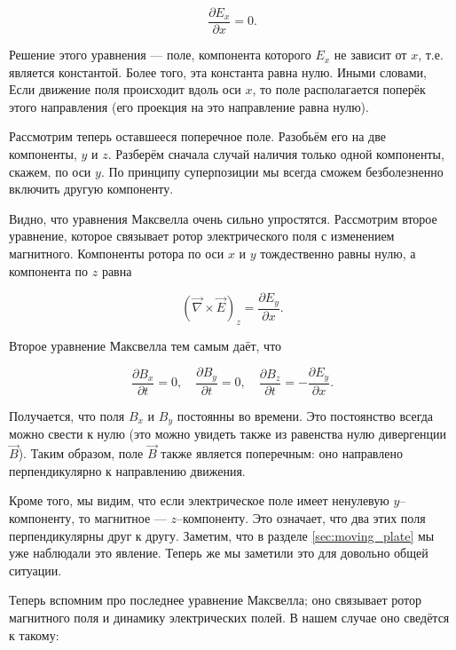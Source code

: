 \documentclass[12pt,a4paper]{article}
\numberwithin{equation}{section}
\numberwithin{equation}{section}
\newcommand{\pt}{\partial}
\newcommand{\vn}{\vec{\nabla}}
\begin{document}
\begin{equation}
  \label{eq:waves_1}
  \frac{\pt E_x}{\pt x}=0.
\end{equation}

Решение этого уравнения --- поле, компонента которого $E_x$ не зависит
от $x$, т.е. является константой. Более того, эта константа равна
нулю. Иными словами, Если движение поля происходит вдоль оси $x$, то
поле располагается поперёк этого направления (его проекция на это
направление равна нулю). 

Рассмотрим теперь оставшееся поперечное поле. Разобьём его на две
компоненты, $y$ и $z$. Разберём сначала случай наличия только одной
компоненты, скажем, по оси $y$. По принципу суперпозиции мы всегда
сможем безболезненно включить другую компоненту. 

Видно, что уравнения Максвелла очень сильно упростятся. Рассмотрим
второе уравнение, которое связывает ротор электрического поля с
изменением магнитного. Компоненты ротора по оси $x$ и $y$ тождественно
равны нулю, а компонента по $z$ равна

\begin{equation}
  \label{eq:waves_2}
  \left(\vn \times \vec{E}  \right)_z = \frac{\pt E_y}{\pt x}.
\end{equation}

Второе уравнение Максвелла тем самым даёт, что

\begin{equation}
  \label{eq:waves_3}
  \frac{\pt B_x}{\pt t} = 0, \quad   \frac{\pt B_y}{\pt t} = 0, \quad
  \frac{\pt B_z}{\pt t} = - \frac{\pt E_y}{\pt x}.
\end{equation}

Получается, что поля $B_x$ и $B_y$ постоянны во времени. Это
постоянство всегда можно свести к нулю (это можно увидеть также из
равенства нулю дивергенции $\vec{B}$). Таким образом, поле $\vec{B}$
также является поперечным: оно направлено перпендикулярно к
направлению движения. 

Кроме того, мы видим, что если электрическое поле имеет ненулевую
$y$--компоненту, то магнитное --- $z$--компоненту. Это означает, что
два этих поля перпендикулярны друг к другу. Заметим, что в разделе
\ref{sec:moving_plate} мы уже наблюдали это явление. Теперь же мы
заметили это для довольно общей ситуации. 

Теперь вспомним про последнее уравнение Максвелла; оно связывает ротор
магнитного поля и динамику электрических полей. В нашем случае оно
сведётся к такому: 
\end{document}
